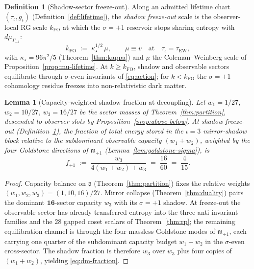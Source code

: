 \documentclass[11pt]{article}
\theoremstyle{plain}
\newtheorem{lemma}[theorem]{Lemma}
\theoremstyle{definition}
\newtheorem{definition}[theorem]{Definition}
\theoremstyle{remark}
\numberwithin{equation}{section}
\begin{document}
\begin{definition}[Shadow-sector freeze-out]\label{def:dm-freezeout}
Along an admitted lifetime chart $(\tau_\iota,g_\iota)$
(Definition~\ref{def:lifetime}), the \emph{shadow freeze-out} scale is the
observer-local RG scale $k_{\mathrm{FO}}$ at which the $\sigma=+1$ reservoir
stops sharing entropy with $d\mu_{\Gamma_{-1}}$:
\begin{equation}\label{eq:dm-freezeout}
  k_{\mathrm{FO}}
  \;:=\;
  \kappa_\star^{1/2}\,\mu,
  \qquad
  \mu\equiv v
  \quad\text{at}\quad
  \tau_\iota=\tau_{\mathrm{EW}},
\end{equation}
with $\kappa_\star=96\pi^2/5$ (Theorem~\ref{thm:kappa}) and $\mu$ the
Coleman--Weinberg scale of Proposition~\ref{prop:mu-lifetime}. At
$k\geq k_{\mathrm{FO}}$, shadow and observable sectors equilibrate through
$\sigma$-even invariants of \eqref{eq:action}; for $k<k_{\mathrm{FO}}$ the
$\sigma=+1$ cohomology residue freezes into non-relativistic dark matter.
\end{definition}

\begin{lemma}[Capacity-weighted shadow fraction at decoupling]
\label{lem:dm-capacity-fraction}
Let $w_1=1/27$, $w_2=10/27$, $w_3=16/27$ be the sector masses of
Theorem~\ref{thm:partition}, descended to observer slots by
Proposition~\ref{prop:above-below}. At shadow freeze-out
(Definition~\ref{def:dm-freezeout}), the fraction of total energy stored in the
$\iota=3$ mirror-shadow block relative to the subdominant observable capacity
$(w_1+w_2)$, weighted by the four Goldstone directions of
$\mathfrak{m}_{+1}$ (Lemma~\ref{lem:goldstone-sigma}), is
\begin{equation}\label{eq:dm-fraction}
  f_{+1}
  \;:=\;
  \frac{w_3}{4(w_1+w_2)+w_3}
  \;=\;
  \frac{16}{60}
  \;=\;
  \frac{4}{15}.
\end{equation}
\end{lemma}

\begin{proof}
Capacity balance on $\mathfrak{d}$ (Theorem~\ref{thm:partition}) fixes the
relative weights $(w_1,w_2,w_3)=(1,10,16)/27$. Mirror collapse
(Theorem~\ref{thm:duality}) pairs the dominant $\mathbf{16}$-sector capacity
$w_3$ with its $\sigma=+1$ shadow. At freeze-out the observable sector has
already transferred entropy into the three anti-invariant families and the
$28$ gapped coset scalars of Theorem~\ref{thm:rp}; the remaining
equilibration channel is through the four massless Goldstone modes of
$\mathfrak{m}_{+1}$, each carrying one quarter of the subdominant capacity
budget $w_1+w_2$ in the $\sigma$-even cross-sector. The shadow fraction is
therefore $w_3$ over $w_3$ plus four copies of $(w_1+w_2)$, yielding
\eqref{eq:dm-fraction}.
\end{proof}
\end{document}
